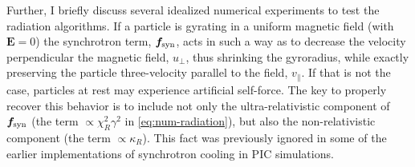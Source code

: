 Further, I briefly discuss several idealized numerical experiments to test the radiation algorithms. If a particle is gyrating in a uniform magnetic field (with $\bm{E}=0$) the synchrotron term, $\bm{f}_{\rm syn}$, acts in such a way as to decrease the velocity perpendicular the magnetic field, $u_\perp$, thus shrinking the gyroradius, while exactly preserving the particle three-velocity parallel to the field, $v_\parallel$. If that is not the case, particles at rest may experience artificial self-force. The key to properly recover this behavior is to include not only the ultra-relativistic component of $\bm{f}_{\rm syn}$ (the term $\propto \chi_R^2\gamma^2$ in \eqref{eq:num-radiation}), but also the non-relativistic component (the term $\propto \kappa_R$). This fact was previously ignored in some of the earlier implementations of synchrotron cooling in PIC simulations. 

\begin{figure}[htb]
\end{figure}

